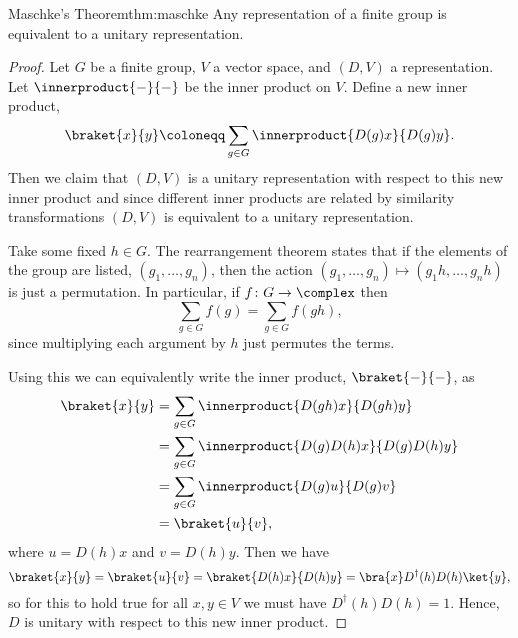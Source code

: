 \documentclass[fleqn]{NotesClass}
\newcommand{\ident}{1}
\newcommand{\hermit}{\dagger}
\begin{document}
    \begin{thm}{Maschke's Theorem}{thm:maschke}
        Any representation of a finite group is equivalent to a unitary representation.
        \begin{proof}
            Let \(G\) be a finite group, \(V\) a vector space, and \((D, V)\) a representation.
            Let \(\innerproduct{-}{-}\) be the inner product on \(V\).
            Define a new inner product,
            \begin{equation}
                \braket{x}{y} \coloneqq \sum_{g \in G} \innerproduct{D(g)x}{D(g)y}.
            \end{equation}
            Then we claim that \((D, V)\) is a unitary representation with respect to this new inner product and since different inner products are related by similarity transformations \((D, V)\) is equivalent to a unitary representation.
            
            Take some fixed \(h \in G\).
            The rearrangement theorem states that if the elements of the group are listed, \((g_1, \dotsc, g_n)\), then the action \((g_1, \dotsc, g_n) \mapsto (g_1h, \dotsc, g_nh)\) is just a permutation.
            In particular, if \(f \colon G \to \complex\) then
            \begin{equation}
                \sum_{g \in G} f(g) = \sum_{g\in G} f(gh),
            \end{equation}
            since multiplying each argument by \(h\) just permutes the terms.
            
            Using this we can equivalently write the inner product, \(\braket{-}{-}\), as
            \begin{align}
                \braket{x}{y} &= \sum_{g\in G} \innerproduct{D(gh)x}{D(gh)y}\\
                &= \sum_{g\in G} \innerproduct{D(g)D(h)x}{D(g)D(h)y}\\
                &= \sum_{g\in G} \innerproduct{D(g)u}{D(g)v}\\
                &= \braket{u}{v},
            \end{align}
            where \(u = D(h)x\) and \(v = D(h)y\).
            Then we have
            \begin{equation}
                \braket{x}{y} = \braket{u}{v} = \braket{D(h)x}{D(h)y} = \bra{x}D^\hermit(h)D(h)\ket{y},
            \end{equation}
            so for this to hold true for all \(x, y \in V\) we must have \(D^\hermit(h)D(h) = \ident\).
            Hence, \(D\) is unitary with respect to this new inner product.
        \end{proof}
    \end{thm}
    
\end{document}
